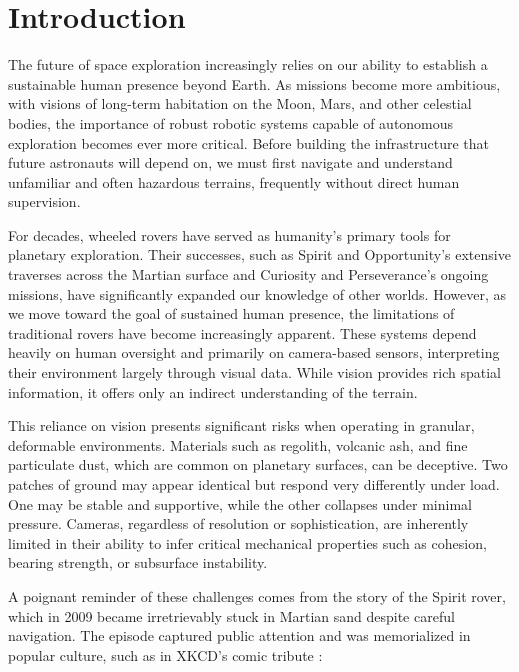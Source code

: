 \chapter{\leavevmode \newline Introduction}
\label{chap:Introduction}

The future of space exploration increasingly relies on our ability to establish a sustainable human presence beyond Earth. As missions become more ambitious, with visions of long-term habitation on the Moon, Mars, and other celestial bodies, the importance of robust robotic systems capable of autonomous exploration becomes ever more critical. Before building the infrastructure that future astronauts will depend on, we must first navigate and understand unfamiliar and often hazardous terrains, frequently without direct human supervision.

For decades, wheeled rovers have served as humanity’s primary tools for planetary exploration. Their successes, such as Spirit and Opportunity’s extensive traverses across the Martian surface and Curiosity and Perseverance's ongoing missions, have significantly expanded our knowledge of other worlds. However, as we move toward the goal of sustained human presence, the limitations of traditional rovers have become increasingly apparent. These systems depend heavily on human oversight and primarily on camera-based sensors, interpreting their environment largely through visual data. While vision provides rich spatial information, it offers only an indirect understanding of the terrain.

This reliance on vision presents significant risks when operating in granular, deformable environments. Materials such as regolith, volcanic ash, and fine particulate dust, which are common on planetary surfaces, can be deceptive. Two patches of ground may appear identical but respond very differently under load. One may be stable and supportive, while the other collapses under minimal pressure. Cameras, regardless of resolution or sophistication, are inherently limited in their ability to infer critical mechanical properties such as cohesion, bearing strength, or subsurface instability.

A poignant reminder of these challenges comes from the story of the Spirit rover, which in 2009 became irretrievably stuck in Martian sand despite careful navigation. The episode captured public attention and was memorialized in popular culture, such as in XKCD’s comic tribute \cite{xkcdspirit}:

